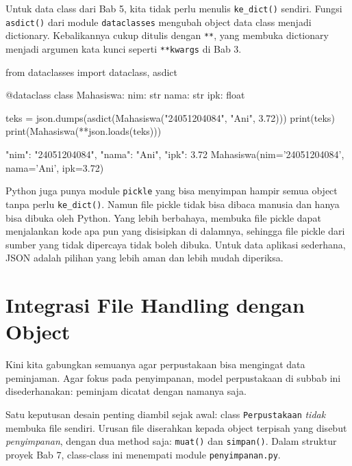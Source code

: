 Untuk data class dari Bab 5, kita tidak perlu menulis \texttt{ke\_dict()} sendiri. Fungsi \texttt{asdict()} dari module \texttt{dataclasses} mengubah object data class menjadi dictionary. Kebalikannya cukup ditulis dengan \texttt{**}, yang membuka dictionary menjadi argumen kata kunci seperti \texttt{**kwargs} di Bab 3.

\begin{kode}
from dataclasses import dataclass, asdict

@dataclass
class Mahasiswa:
    nim: str
    nama: str
    ipk: float

teks = json.dumps(asdict(Mahasiswa("24051204084", "Ani", 3.72)))
print(teks)
print(Mahasiswa(**json.loads(teks)))
\end{kode}

\begin{keluaran}
{"nim": "24051204084", "nama": "Ani", "ipk": 3.72}
Mahasiswa(nim='24051204084', nama='Ani', ipk=3.72)
\end{keluaran}

\begin{penting}
Python juga punya module \texttt{pickle} yang bisa menyimpan hampir semua object tanpa perlu \texttt{ke\_dict()}. Namun file pickle tidak bisa dibaca manusia dan hanya bisa dibuka oleh Python. Yang lebih berbahaya, membuka file pickle dapat menjalankan kode apa pun yang disisipkan di dalamnya, sehingga file pickle dari sumber yang tidak dipercaya tidak boleh dibuka. Untuk data aplikasi sederhana, JSON adalah pilihan yang lebih aman dan lebih mudah diperiksa.
\end{penting}

\section{Integrasi File Handling dengan Object}

Kini kita gabungkan semuanya agar perpustakaan bisa mengingat data peminjaman. Agar fokus pada penyimpanan, model perpustakaan di subbab ini disederhanakan: peminjam dicatat dengan namanya saja.

Satu keputusan desain penting diambil sejak awal: class \texttt{Perpustakaan} \emph{tidak} membuka file sendiri. Urusan file diserahkan kepada object terpisah yang disebut \emph{penyimpanan}, dengan dua method saja: \texttt{muat()} dan \texttt{simpan()}. Dalam struktur proyek Bab 7, class-class ini menempati module \texttt{penyimpanan.py}.

